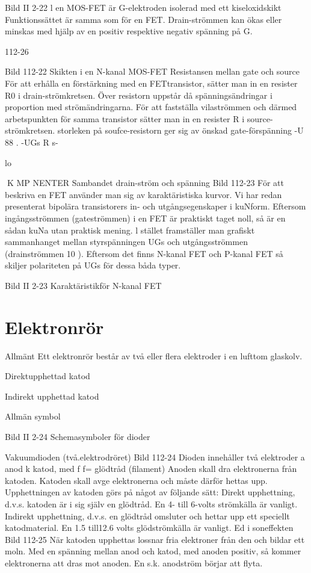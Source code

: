 {{Bild II 2-22
l en MOS-FET är G-elektroden isolerad med
ett kiseloxidskikt Funktionssättet är samma
som för en FET. Drain-strömmen kan ökas
eller minskas med hjälp av en positiv respektive negativ spänning på G.

112-26

Bild 112-22 Skikten i en N-kanal MOS-FET
Resistansen mellan gate och source
För att erhålla en förstärkning med en FETtransistor, sätter man in en resister R0 i
drain-strömkretsen. Över resistorn uppstår
då spänningsändringar i proportion med
strömändringarna.
För att fastställa vilaströmmen och därmed arbetspunkten för samma transistor
sätter man in en resister R i source-strömkretsen. storleken på soufce-resistorn ger
sig av önskad gate-förspänning -U 88 .
 -UGs
R s-

lo

K MP NENTER
Sambandet drain-ström och spänning
Bild 112-23
För att beskriva en FET använder man sig
av karaktäristiska kurvor. Vi har redan presenterat bipolära transistorers in- och utgångsegenskaper i kuNform. Eftersom ingångsströmmen (gateströmmen) i en FET
är praktiskt taget noll, så är en sådan kuNa
utan praktisk mening. l stället framställer
man grafiskt sammanhanget mellan styrspänningen UGs och utgångsströmmen (drainströmmen 10 ). Eftersom det finns N-kanal
FET och P-kanal FET så skiljer polariteten
på UGs för dessa båda typer.

Bild II 2-23 Karaktäristikför N-kanal FET

\section{Elektronrör}
Allmänt
Ett elektronrör består av två eller flera elektroder i en lufttom glaskolv.

Direktupphettad
katod

Indirekt upphettad katod

Allmän
symbol

Bild II 2-24 Schemasymboler för dioder

Vakuumdioden (två.elektrodröret)
Bild 112-24
Dioden innehåller två elektroder
a anod
k katod, med f f= glödtråd (filament)
Anoden skall dra elektronerna från katoden.
Katoden skall avge elektronerna och måste
därför hettas upp.
Upphettningen av katoden görs på något
av följande sätt:
Direkt upphettning, d.v.s. katoden är i sig
själv en glödtråd. En 4- till 6-volts strömkälla
är vanligt.
Indirekt upphettning, d.v.s. en glödtråd
omsluter och hettar upp ett speciellt katodmaterial. En 1.5 till12.6 volts glödströmkälla
är vanligt.
Ed i soneffekten
Bild 112-25
När katoden upphettas lossnar fria elektroner från den och bildar ett moln. Med en
spänning mellan anod och katod, med
anoden positiv, så kommer elektronerna att
dras mot anoden. En s.k. anodström börjar
att flyta.

}}
